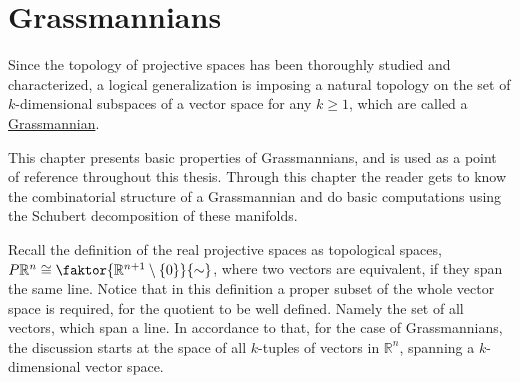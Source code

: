 \chapter{Grassmannians}
Since the topology of projective spaces has been thoroughly studied and characterized, a logical generalization is imposing a natural topology on the set of $k$-dimensional subspaces of a vector space for any $k\geq1$, which are called a \ul{Grassmannian}.

This chapter presents basic properties of Grassmannians, and is used as a point of reference throughout this thesis.
Through this chapter the reader gets to know the combinatorial structure of a Grassmannian and do basic computations using the Schubert decomposition of these manifolds.

Recall the definition of the real projective spaces as topological spaces,
$P\mathbb{R}^n\cong\faktor{\mathbb{R}^{n+1}\setminus\{0\}}{\sim}$,
where two vectors are equivalent, if they span the same line. Notice that in this definition a proper subset of the whole vector space is required, for the quotient to be well defined. Namely the set of all vectors, which span a line. In accordance to that, for the case of Grassmannians, the discussion starts at the space of all $k$-tuples of vectors in $\mathbb{R}^n$, spanning a $k$-dimensional vector space.

